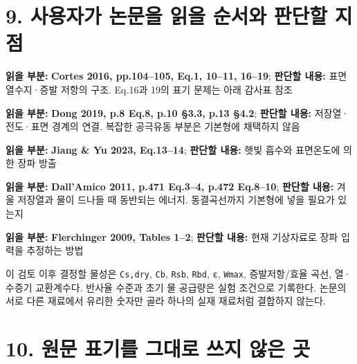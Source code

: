 \documentclass[11pt,a4paper]{article}
\begin{document}
\section{9. 사용자가 논문을 읽을 순서와 판단할 지점}

\begin{description}[leftmargin=0pt,style=nextline]
\item[1] \textbf{읽을 부분:} \textbf{Cortes 2016, pp.104–105, Eq.1, 10–11, 16–19}; \textbf{판단할 내용:} 표면 열수지·증발 저항의 구조. Eq.16과 19의 표기 문제는 아래 감사표 참조
\item[2] \textbf{읽을 부분:} \textbf{Dong 2019, p.8 Eq.8, p.10 §3.3, p.13 §4.2}; \textbf{판단할 내용:} 저장열·전도·표면 경계의 연결. 복잡한 공극유동 부분은 기본형에 채택하지 않음
\item[3] \textbf{읽을 부분:} \textbf{Jiang \& Yu 2023, Eq.13–14}; \textbf{판단할 내용:} 햇빛 흡수와 표면온도에 의한 장파 방출
\item[4] \textbf{읽을 부분:} \textbf{Dall'Amico 2011, p.471 Eq.3–4, p.472 Eq.8–10}; \textbf{판단할 내용:} 겨울 저장열과 물이 드나들 때 동반되는 에너지. 동결곡선까지 기본형에 넣을 필요가 있는지
\item[보조] \textbf{읽을 부분:} \textbf{Flerchinger 2009, Tables 1–2}; \textbf{판단할 내용:} 현재 기상자료로 장파 입력을 추정하는 방법
\end{description}

이 검토 이후 결정할 물성은 \texttt{Cs,dry}, \texttt{Cb}, \texttt{Rsb}, \texttt{Rbd}, \texttt{ε}, \texttt{Wmax}, 증발저항/효율 곡선, 열·수증기 교환계수다. 반사율 수준과 초기 물 공급량은 실험 조건으로 기록한다. 논문의 서로 다른 재료에서 유리한 숫자만 골라 하나의 실재 재료처럼 결합하지 않는다.

\section{10. 원문 표기를 그대로 쓰지 않은 곳}
\end{document}
